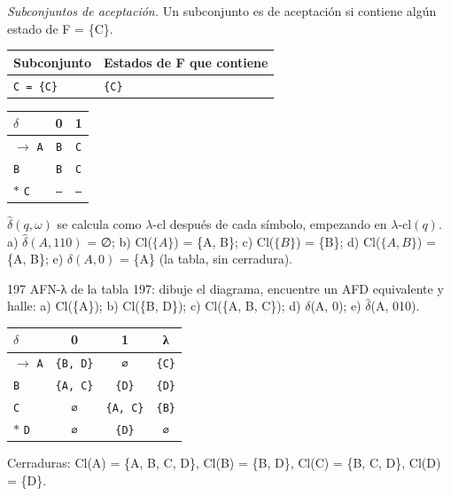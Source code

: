 \documentclass[11pt]{article}
\begin{document}
\textit{Subconjuntos de aceptación.} Un subconjunto es de aceptación si contiene algún estado de F = \{C\}.
\begin{center}\footnotesize\begin{tabular}{ll}\toprule
Subconjunto & Estados de F que contiene \\\midrule
\texttt{C = \{C\}} & \texttt{\{C\}} \\
\bottomrule\end{tabular}\end{center}
\begin{center}\small\begin{tabular}{lcc}\toprule
$\delta$ & 0 & 1 \\\midrule
$\to$ \texttt{A} & \texttt{B} & \texttt{C} \\
 \texttt{B} & \texttt{B} & \texttt{C} \\
$*$ \texttt{C} & \texttt{--} & \texttt{--} \\
\bottomrule\end{tabular}\end{center}
$\hat\delta(q, \omega)$ se calcula como $\lambda$-cl después de cada símbolo, empezando en $\lambda$-cl$(q)$.
\resp a) $\hat\delta(A, 110)$ = ∅; b) Cl($\{A\}$) = \{A, B\}; c) Cl($\{B\}$) = \{B\}; d) Cl($\{A, B\}$) = \{A, B\}; e) $\delta(A, 0)$ = \{A\} (la tabla, sin cerradura).


\begin{ejercicio}{197}{}
AFN-λ de la tabla 197: dibuje el diagrama, encuentre un AFD equivalente y halle: a) Cl(\{A\}); b) Cl(\{B, D\}); c) Cl(\{A, B, C\}); d) $\delta$(A, 0); e) $\hat\delta$(A, 010).
\end{ejercicio}
\proc \begin{center}\small\begin{tabular}{lccc}\toprule
$\delta$ & 0 & 1 & λ \\\midrule
$\to$ \texttt{A} & \texttt{\{B, D\}} & \texttt{∅} & \texttt{\{C\}} \\
 \texttt{B} & \texttt{\{A, C\}} & \texttt{\{D\}} & \texttt{\{D\}} \\
 \texttt{C} & \texttt{∅} & \texttt{\{A, C\}} & \texttt{\{B\}} \\
$*$ \texttt{D} & \texttt{∅} & \texttt{\{D\}} & \texttt{∅} \\
\bottomrule\end{tabular}\end{center}
Cerraduras: Cl(A) = \{A, B, C, D\}, Cl(B) = \{B, D\}, Cl(C) = \{B, C, D\}, Cl(D) = \{D\}.
\end{document}
